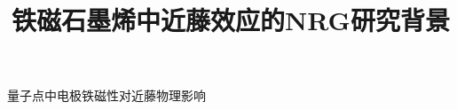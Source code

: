 \documentclass[9pt,t]{beamer} %
\begin{document}
\begin{frame}{量子点中电极铁磁性对近藤物理影响}
\begin{minipage}[t]{0.5 \textwidth}
\begin{figure}
\end{figure}
\vspace{-0.4cm}
\end{minipage}
\end{frame}

\title{铁磁石墨烯中近藤效应的NRG研究\qquad \qquad \qquad \qquad 背景}
\end{document}
